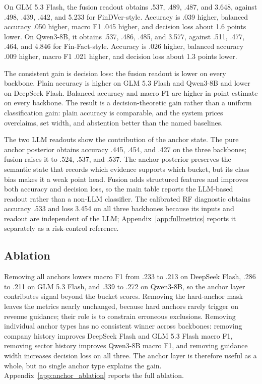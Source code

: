 \documentclass[11pt]{article}
\begin{document}
On GLM 5.3 Flash, the fusion readout obtains .537, .489, .487, and 3.648, against .498, .439, .442, and 5.233 for FinDVer-style. Accuracy is .039 higher, balanced accuracy .050 higher, macro F1 .045 higher, and decision loss about 1.6 points lower. On Qwen3-8B, it obtains .537, .486, .485, and 3.577, against .511, .477, .464, and 4.846 for Fin-Fact-style. Accuracy is .026 higher, balanced accuracy .009 higher, macro F1 .021 higher, and decision loss about 1.3 points lower.

The consistent gain is decision loss: the fusion readout is lower on every backbone. Plain accuracy is higher on GLM 5.3 Flash and Qwen3-8B and lower on DeepSeek Flash. Balanced accuracy and macro F1 are higher in point estimate on every backbone. The result is a decision-theoretic gain rather than a uniform classification gain: plain accuracy is comparable, and the system prices overclaims, set width, and abstention better than the named baselines.

The two LLM readouts show the contribution of the anchor state. The pure anchor posterior obtains accuracy .445, .454, and .427 on the three backbones; fusion raises it to .524, .537, and .537. The anchor posterior preserves the semantic state that records which evidence supports which bucket, but its class bias makes it a weak point head. Fusion adds structured features and improves both accuracy and decision loss, so the main table reports the LLM-based readout rather than a non-LLM classifier. The calibrated RF diagnostic obtains accuracy .533 and loss 3.454 on all three backbones because its inputs and readout are independent of the LLM; Appendix~\ref{app:fullmetrics} reports it separately as a risk-control reference.



\subsection{Ablation}
Removing all anchors lowers macro F1 from .233 to .213 on DeepSeek Flash, .286 to .211 on GLM 5.3 Flash, and .339 to .272 on Qwen3-8B, so the anchor layer contributes signal beyond the bucket scores. Removing the hard-anchor mask leaves the metrics nearly unchanged, because hard anchors rarely trigger on revenue guidance; their role is to constrain erroneous exclusions. Removing individual anchor types has no consistent winner across backbones: removing company history improves DeepSeek Flash and GLM 5.3 Flash macro F1, removing sector history improves Qwen3-8B macro F1, and removing guidance width increases decision loss on all three. The anchor layer is therefore useful as a whole, but no single anchor type explains the gain. Appendix~\ref{app:anchor_ablation} reports the full ablation.
\end{document}
